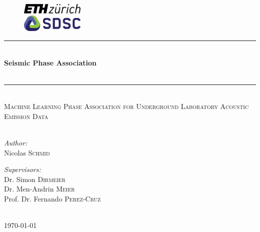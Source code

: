 \documentclass{scrreprt}
\author{First Name LAST NAME}
\date{\today}
\begin{document}
\begin{titlepage}

\begin{figure}
\begin{minipage}{0.50\columnwidth}
\begin{flushleft}
\includegraphics[width=3cm]{logos/ethz.jpg}
\end{flushleft}
\end{minipage}
\begin{minipage}{0.50\columnwidth}
\begin{flushright}
\includegraphics[width=3cm]{logos/sdsc.jpg}
\end{flushright}
\end{minipage}%
\end{figure}%

\vspace*{5cm}
\newcommand{\HRule}{\rule{\linewidth}{0.5mm}}
\newcommand{\hRule}{\rule{\linewidth}{0.25mm}}

\center
\rule{\linewidth}{0.25mm}\\[0.4cm]
{\vspace{0.2in}\Huge \sffamily \bfseries Seismic Phase Association }\\~~\\
\rule{\linewidth}{0.5mm}\\[2.5cm]
{\scshape \large Machine Learning Phase Association for Underground Laboratory Acoustic Emission Data}\\~~\\
\vspace*{5cm}
\begin{minipage}{0.45\textwidth}
\begin{flushleft} \large
\emph{Author:}\\
Nicolas \textsc{Schmid} 
\end{flushleft}
\end{minipage}
\begin{minipage}{0.45\textwidth}
\begin{flushright} \large
\emph{Supervisors:} \\
Dr. Simon \textsc{Dirmeier} \\
Dr. Men-Andrin \textsc{Meier} \\
Prof. Dr. Fernando \textsc{Perez-Cruz}
\end{flushright}
\end{minipage}\\[1cm]
{\large \today}
\end{titlepage}
\end{document}
